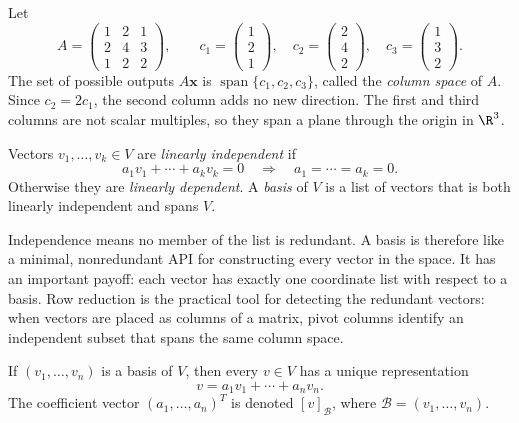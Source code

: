 \begin{example}
Let
\[
 A=\begin{pmatrix}1&2&1\\2&4&3\\1&2&2\end{pmatrix},\qquad
 c_1=\begin{pmatrix}1\\2\\1\end{pmatrix},\quad
 c_2=\begin{pmatrix}2\\4\\2\end{pmatrix},\quad
 c_3=\begin{pmatrix}1\\3\\2\end{pmatrix}.
\]
The set of possible outputs $A\mathbf{x}$ is $\operatorname{span}\{c_1,c_2,c_3\}$, called the \emph{column space} of $A$. Since $c_2=2c_1$, the second column adds no new direction. The first and third columns are not scalar multiples, so they span a plane through the origin in $\R^3$.
\end{example}

\begin{definition}
Vectors $v_1,\ldots,v_k\in V$ are \emph{linearly independent} if
\[
  a_1v_1+\cdots+a_kv_k=0 \quad\Longrightarrow\quad a_1=\cdots=a_k=0.
\]
Otherwise they are \emph{linearly dependent}. A \emph{basis} of $V$ is a list of vectors that is both linearly independent and spans $V$.
\end{definition}

Independence means no member of the list is redundant. A basis is therefore like a minimal, nonredundant API for constructing every vector in the space. It has an important payoff: each vector has exactly one coordinate list with respect to a basis. Row reduction is the practical tool for detecting the redundant vectors: when vectors are placed as columns of a matrix, pivot columns identify an independent subset that spans the same column space.

\begin{theorem}\label{thm:unique-coordinates}
If $(v_1,\ldots,v_n)$ is a basis of $V$, then every $v\in V$ has a unique representation
\[
  v=a_1v_1+\cdots+a_nv_n.
\]
The coefficient vector $(a_1,\ldots,a_n)^T$ is denoted $[v]_{\mathcal B}$, where $\mathcal B=(v_1,\ldots,v_n)$.
\end{theorem}

